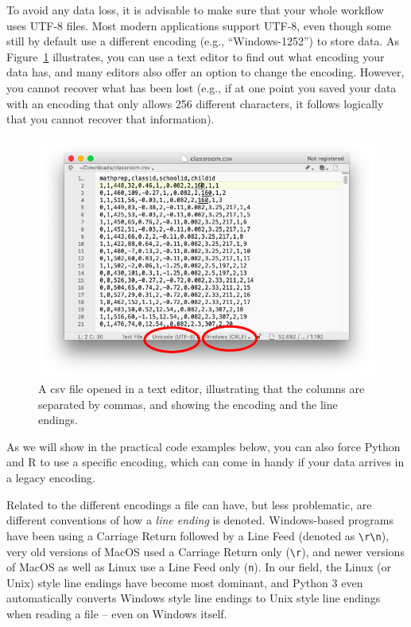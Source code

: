 To avoid any data loss, it is advisable to make sure that your whole workflow uses UTF-8 files. Most modern applications support UTF-8, even though some still by default use a different encoding (e.g., ``Windows-1252'') to store data. As Figure~\ref{fig:csv-in-editor} illustrates, you can use a text editor to find out what encoding your data has, and many editors also offer an option to change the encoding. However, you cannot recover what has been lost (e.g., if at one point you saved your data with an encoding that only allows 256 different characters, it follows logically that you cannot recover that information).


\begin{figure}
\centering
\includegraphics[width=0.9\linewidth]{figures/ch6_csv-in-editor.png}
\caption{A csv file opened in a text editor, illustrating that the columns are separated by commas, and showing the encoding and the line endings.}
\label{fig:csv-in-editor}
\end{figure}

As we will show in the practical code examples below, you can also force Python and R to use a specific encoding, which can come in handy if your data arrives in a legacy encoding.

Related to the different encodings a file can have, but less problematic, are different conventions of how a \emph{line ending} is denoted.
Windows-based programs have been using a Carriage Return followed by a Line Feed (denoted as \verb+\r\n+),
very old versions of MacOS used a Carriage Return only (\verb+\r+), and newer versions of MacOS as well as Linux use a Line Feed only (\verb+n+).
In our field, the Linux (or Unix) style line endings have become most dominant,
and Python 3 even automatically converts Windows style line endings to Unix style line endings when reading a file -- even on Windows itself.

